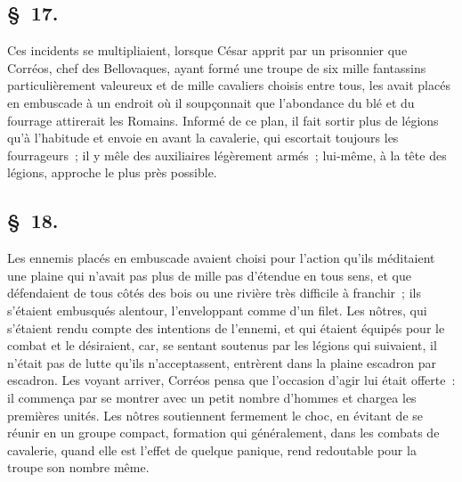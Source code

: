 \documentclass[french,twoside]{book} %
\begin{document}
\subsection[{§ 17.}]{ \textsc{§ 17.} }
\noindent Ces incidents se multipliaient, lorsque César apprit par un prisonnier que Corréos, chef des Bellovaques, ayant formé une troupe de six mille fantassins particulièrement valeureux et de mille cavaliers choisis entre tous, les avait placés en embuscade à un endroit où il soupçonnait que l’abondance du blé et du fourrage attirerait les Romains. Informé de ce plan, il fait sortir plus de légions qu’à l’habitude et envoie en avant la cavalerie, qui escortait toujours les fourrageurs ; il y mêle des auxiliaires légèrement armés ; lui-même, à la tête des légions, approche le plus près possible.
\subsection[{§ 18.}]{ \textsc{§ 18.} }
\noindent Les ennemis placés en embuscade avaient choisi pour l’action qu’ils méditaient une plaine qui n’avait pas plus de mille pas d’étendue en tous sens, et que défendaient de tous côtés des bois ou une rivière très difficile à franchir ; ils s’étaient embusqués alentour, l’enveloppant comme d’un filet. Les nôtres, qui s’étaient rendu compte des intentions de l’ennemi, et qui étaient équipés pour le combat et le désiraient, car, se sentant soutenus par les légions qui suivaient, il n’était pas de lutte qu’ils n’acceptassent, entrèrent dans la plaine escadron par escadron. Les voyant arriver, Corréos pensa que l’occasion d’agir lui était offerte : il commença par se montrer avec un petit nombre d’hommes et chargea les premières unités. Les nôtres soutiennent fermement le choc, en évitant de se réunir en un groupe compact, formation qui généralement, dans les combats de cavalerie, quand elle est l’effet de quelque panique, rend redoutable pour la troupe son nombre même.
\end{document}
